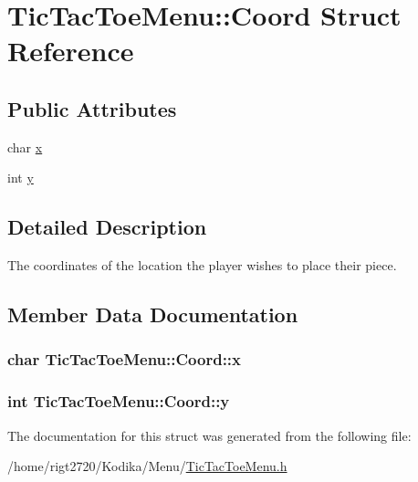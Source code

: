 \hypertarget{structTicTacToeMenu_1_1Coord}{\section{Tic\-Tac\-Toe\-Menu\-:\-:Coord Struct Reference}
\label{structTicTacToeMenu_1_1Coord}
}
\subsection*{Public Attributes}
\begin{DoxyCompactItemize}
\item 
char \hyperlink{structTicTacToeMenu_1_1Coord_a06b6253de92593cd52068185aae41a31}{x}
\item 
int \hyperlink{structTicTacToeMenu_1_1Coord_a537516d9b1bdfff45765fbd4c7716a37}{y}
\end{DoxyCompactItemize}


\subsection{Detailed Description}
The coordinates of the location the player wishes to place their piece. 

\subsection{Member Data Documentation}
\hypertarget{structTicTacToeMenu_1_1Coord_a06b6253de92593cd52068185aae41a31}{
\subsubsection[{x}]{\setlength{\rightskip}{0pt plus 5cm}char Tic\-Tac\-Toe\-Menu\-::\-Coord\-::x}}\label{structTicTacToeMenu_1_1Coord_a06b6253de92593cd52068185aae41a31}
\hypertarget{structTicTacToeMenu_1_1Coord_a537516d9b1bdfff45765fbd4c7716a37}{
\subsubsection[{y}]{\setlength{\rightskip}{0pt plus 5cm}int Tic\-Tac\-Toe\-Menu\-::\-Coord\-::y}}\label{structTicTacToeMenu_1_1Coord_a537516d9b1bdfff45765fbd4c7716a37}


The documentation for this struct was generated from the following file\-:\begin{DoxyCompactItemize}
\item 
/home/rigt2720/\-Kodika/\-Menu/\hyperlink{TicTacToeMenu_8h}{Tic\-Tac\-Toe\-Menu.\-h}\end{DoxyCompactItemize}
